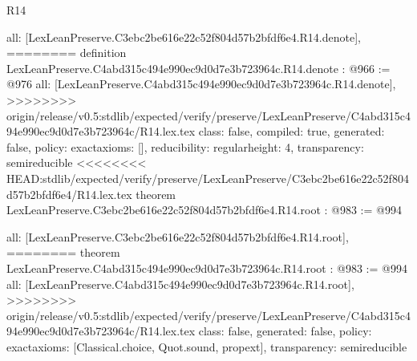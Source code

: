 \begin{lexlean}{R14}
\begin{coremodule}
{{{{{{{{{{{{  all: [LexLeanPreserve.C3ebc2be616e22c52f804d57b2bfdf6e4.R14.denote],
========
definition LexLeanPreserve.C4abd315c494e990ec9d0d7e3b723964c.R14.denote : @966 := @976 {
  all: [LexLeanPreserve.C4abd315c494e990ec9d0d7e3b723964c.R14.denote],
>>>>>>>> origin/release/v0.5:stdlib/expected/verify/preserve/LexLeanPreserve/C4abd315c494e990ec9d0d7e3b723964c/R14.lex.tex
  class: false,
  compiled: true,
  generated: false,
  policy: exact{axioms: []},
  reducibility: regular{height: 4},
  transparency: semireducible
}
<<<<<<<< HEAD:stdlib/expected/verify/preserve/LexLeanPreserve/C3ebc2be616e22c52f804d57b2bfdf6e4/R14.lex.tex
theorem LexLeanPreserve.C3ebc2be616e22c52f804d57b2bfdf6e4.R14.root : @983 := @994 {
  all: [LexLeanPreserve.C3ebc2be616e22c52f804d57b2bfdf6e4.R14.root],
========
theorem LexLeanPreserve.C4abd315c494e990ec9d0d7e3b723964c.R14.root : @983 := @994 {
  all: [LexLeanPreserve.C4abd315c494e990ec9d0d7e3b723964c.R14.root],
>>>>>>>> origin/release/v0.5:stdlib/expected/verify/preserve/LexLeanPreserve/C4abd315c494e990ec9d0d7e3b723964c/R14.lex.tex
  class: false,
  generated: false,
  policy: exact{axioms: [Classical.choice, Quot.sound, propext]},
  transparency: semireducible
}

}}}}}}}}}}}}}
\end{coremodule}
\end{lexlean}
